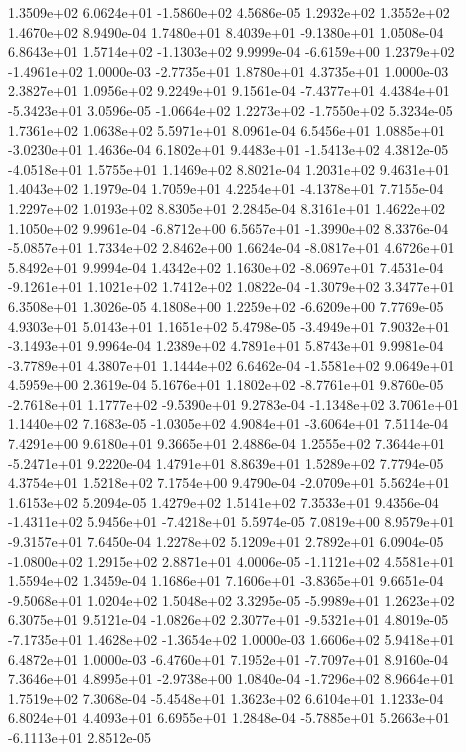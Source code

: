  1.3509e+02  6.0624e+01 -1.5860e+02  4.5686e-05
1.2932e+02 1.3552e+02 1.4670e+02  8.9490e-04
 1.7480e+01  8.4039e+01 -9.1380e+01  1.0508e-04
 6.8643e+01  1.5714e+02 -1.1303e+02  9.9999e-04
-6.6159e+00  1.2379e+02 -1.4961e+02  1.0000e-03
-2.7735e+01  1.8780e+01  4.3735e+01  1.0000e-03
2.3827e+01 1.0956e+02 9.2249e+01  9.1561e-04
-7.4377e+01  4.4384e+01 -5.3423e+01  3.0596e-05
-1.0664e+02  1.2273e+02 -1.7550e+02  5.3234e-05
1.7361e+02 1.0638e+02 5.5971e+01  8.0961e-04
 6.5456e+01  1.0885e+01 -3.0230e+01  1.4636e-04
 6.1802e+01  9.4483e+01 -1.5413e+02  4.3812e-05
-4.0518e+01  1.5755e+01  1.1469e+02  8.8021e-04
1.2031e+02 9.4631e+01 1.4043e+02  1.1979e-04
 1.7059e+01  4.2254e+01 -4.1378e+01  7.7155e-04
1.2297e+02 1.0193e+02 8.8305e+01  2.2845e-04
8.3161e+01 1.4622e+02 1.1050e+02  9.9961e-04
-6.8712e+00  6.5657e+01 -1.3990e+02  8.3376e-04
-5.0857e+01  1.7334e+02  2.8462e+00  1.6624e-04
-8.0817e+01  4.6726e+01  5.8492e+01  9.9994e-04
 1.4342e+02  1.1630e+02 -8.0697e+01  7.4531e-04
-9.1261e+01  1.1021e+02  1.7412e+02  1.0822e-04
-1.3079e+02  3.3477e+01  6.3508e+01  1.3026e-05
 4.1808e+00  1.2259e+02 -6.6209e+00  7.7769e-05
4.9303e+01 5.0143e+01 1.1651e+02  5.4798e-05
-3.4949e+01  7.9032e+01 -3.1493e+01  9.9964e-04
1.2389e+02 4.7891e+01 5.8743e+01  9.9981e-04
-3.7789e+01  4.3807e+01  1.1444e+02  6.6462e-04
-1.5581e+02  9.0649e+01  4.5959e+00  2.3619e-04
 5.1676e+01  1.1802e+02 -8.7761e+01  9.8760e-05
-2.7618e+01  1.1777e+02 -9.5390e+01  9.2783e-04
-1.1348e+02  3.7061e+01  1.1440e+02  7.1683e-05
-1.0305e+02  4.9084e+01 -3.6064e+01  7.5114e-04
7.4291e+00 9.6180e+01 9.3665e+01  2.4886e-04
 1.2555e+02  7.3644e+01 -5.2471e+01  9.2220e-04
1.4791e+01 8.8639e+01 1.5289e+02  7.7794e-05
4.3754e+01 1.5218e+02 7.1754e+00  9.4790e-04
-2.0709e+01  5.5624e+01  1.6153e+02  5.2094e-05
1.4279e+02 1.5141e+02 7.3533e+01  9.4356e-04
-1.4311e+02  5.9456e+01 -7.4218e+01  5.5974e-05
 7.0819e+00  8.9579e+01 -9.3157e+01  7.6450e-04
1.2278e+02 5.1209e+01 2.7892e+01  6.0904e-05
-1.0800e+02  1.2915e+02  2.8871e+01  4.0006e-05
-1.1121e+02  4.5581e+01  1.5594e+02  1.3459e-04
 1.1686e+01  7.1606e+01 -3.8365e+01  9.6651e-04
-9.5068e+01  1.0204e+02  1.5048e+02  3.3295e-05
-5.9989e+01  1.2623e+02  6.3075e+01  9.5121e-04
-1.0826e+02  2.3077e+01 -9.5321e+01  4.8019e-05
-7.1735e+01  1.4628e+02 -1.3654e+02  1.0000e-03
1.6606e+02 5.9418e+01 6.4872e+01  1.0000e-03
-6.4760e+01  7.1952e+01 -7.7097e+01  8.9160e-04
 7.3646e+01  4.8995e+01 -2.9738e+00  1.0840e-04
-1.7296e+02  8.9664e+01  1.7519e+02  7.3068e-04
-5.4548e+01  1.3623e+02  6.6104e+01  1.1233e-04
6.8024e+01 4.4093e+01 6.6955e+01  1.2848e-04
-5.7885e+01  5.2663e+01 -6.1113e+01  2.8512e-05
